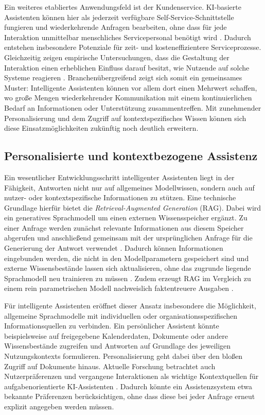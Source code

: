 Ein weiteres etabliertes Anwendungsfeld ist der Kundenservice. KI-basierte Assistenten können hier als jederzeit verfügbare Self-Service-Schnittstelle fungieren und wiederkehrende Anfragen bearbeiten, ohne dass für jede Interaktion unmittelbar menschliches Servicepersonal benötigt wird \cite{adam2021chatbots}. Dadurch entstehen insbesondere Potenziale für zeit- und kosteneffizientere Serviceprozesse. Gleichzeitig zeigen empirische Untersuchungen, dass die Gestaltung der Interaktion einen erheblichen Einfluss darauf besitzt, wie Nutzende auf solche Systeme reagieren \cite{adam2021chatbots}. Branchenübergreifend zeigt sich somit ein gemeinsames Muster: Intelligente Assistenten können vor allem dort einen Mehrwert schaffen, wo große Mengen wiederkehrender Kommunikation mit einem kontinuierlichen Bedarf an Informationen oder Unterstützung zusammentreffen. Mit zunehmender Personalisierung und dem Zugriff auf kontextspezifisches Wissen können sich diese Einsatzmöglichkeiten zukünftig noch deutlich erweitern.

\subsection{Personalisierte und kontextbezogene Assistenz}

Ein wesentlicher Entwicklungsschritt intelligenter Assistenten liegt in der Fähigkeit, Antworten nicht nur auf allgemeines Modellwissen, sondern auch auf nutzer- oder kontextspezifische Informationen zu stützen. Eine technische Grundlage hierfür bietet die \textit{Retrieval-Augmented Generation} (\acs{RAG}). Dabei wird ein generatives Sprachmodell um einen externen Wissensspeicher ergänzt. Zu einer Anfrage werden zunächst relevante Informationen aus diesem Speicher abgerufen und anschließend gemeinsam mit der ursprünglichen Anfrage für die Generierung der Antwort verwendet \cite{lewis2020retrieval}. Dadurch können Informationen eingebunden werden, die nicht in den Modellparametern gespeichert sind und externe Wissensbestände lassen sich aktualisieren, ohne das zugrunde liegende Sprachmodell neu trainieren zu müssen \cite{lewis2020retrieval}. Zudem erzeugt RAG im Vergleich zu einem rein parametrischen Modell nachweislich faktentreuere Ausgaben \cite{lewis2020retrieval}.

Für intelligente Assistenten eröffnet dieser Ansatz insbesondere die Möglichkeit, allgemeine Sprachmodelle mit individuellen oder organisationsspezifischen Informationsquellen zu verbinden. Ein persönlicher Assistent könnte beispielsweise auf freigegebene Kalenderdaten, Dokumente oder andere Wissensbestände zugreifen und Antworten auf Grundlage des jeweiligen Nutzungskontexts formulieren. Personalisierung geht dabei über den bloßen Zugriff auf Dokumente hinaus. Aktuelle Forschung betrachtet auch Nutzerpräferenzen und vergangene Interaktionen als wichtige Kontextquellen für aufgabenorientierte KI-Assistenten \cite{zhao2025personalens}. Dadurch könnte ein Assistenzsystem etwa bekannte Präferenzen berücksichtigen, ohne dass diese bei jeder Anfrage erneut explizit angegeben werden müssen.

